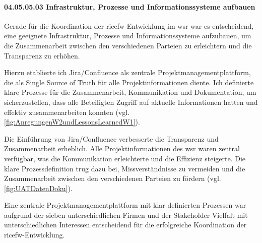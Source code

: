 \paragraph*{04.05.05.03 Infrastruktur, Prozesse und Informationssysteme aufbauen}
\label{para:04.05.05.03_InfrastrukturProzesseUndInformationssysteme}

\par Gerade für die Koordination der \gls{ricefw}-Entwicklung im \gls{wsr} war es entscheidend, eine geeignete Infrastruktur, Prozesse und Informationssysteme aufzubauen, um die Zusammenarbeit zwischen den verschiedenen Parteien zu erleichtern und die Transparenz zu erhöhen.

\par Hierzu etablierte ich Jira/Confluence als zentrale Projektmanagementplattform, die als Single Source of Truth für alle Projektinformationen diente. Ich definierte klare Prozesse für die Zusammenarbeit, Kommunikation und Dokumentation, um sicherzustellen, dass alle Beteiligten Zugriff auf aktuelle Informationen hatten und effektiv zusammenarbeiten konnten (vgl. \autoref{fig:AnregungenW2undLessonsLearnedW1}).

\par Die Einführung von Jira/Confluence verbesserte die Transparenz und Zusammenarbeit erheblich. Alle Projektinformationen des \gls{wsr} waren zentral verfügbar, was die Kommunikation erleichterte und die Effizienz steigerte. Die klare Prozessdefinition trug dazu bei, Missverständnisse zu vermeiden und die Zusammenarbeit zwischen den verschiedenen Parteien zu fördern (vgl. \autoref{fig:UATDatenDoku}).

\par Eine zentrale Projektmanagementplattform mit klar definierten Prozessen war aufgrund der sieben unterschiedlichen Firmen und der Stakeholder-Vielfalt mit unterschiedlichen Interessen entscheidend für die erfolgreiche Koordination der \gls{ricefw}-Entwicklung. 